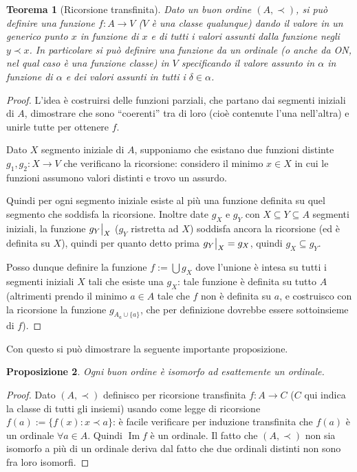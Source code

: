 \documentclass[a4paper,10pt,oneside]{article}
\newcommand\restr[2]{{%
  \left.\kern-\nulldelimiterspace %
  #1 %
  \vphantom{\big|} %
  \right|_{#2} %
  }}
\DeclareMathOperator{\im}{Im}
\theoremstyle{plain}
\newtheorem{mytheorem}{Teorema}[section]
\newtheorem{myprop}[mytheorem]{Proposizione}
\theoremstyle{definition}
\theoremstyle{remark}
\begin{document}
\begin{mytheorem}[Ricorsione transfinita]
 Dato un buon ordine $(A,\prec)$, si può definire una funzione $f:A \rightarrow V$ ($V$ è una classe qualunque) dando il valore in un generico punto $x$ in funzione di $x$ e di tutti i valori assunti dalla funzione negli $y\prec x$. In particolare si può definire una funzione da un ordinale (o anche da ON, nel qual caso è una funzione classe) in $V$ specificando il valore assunto in $\alpha$ in funzione di $\alpha$ e dei valori assunti in tutti i $\delta \in \alpha$.
\end{mytheorem}
\begin{proof}
 L'idea è costruirsi delle funzioni parziali, che partano dai segmenti iniziali di $A$, dimostrare che sono ``coerenti'' tra di loro (cioè contenute l'una nell'altra) e unirle tutte per ottenere $f$.
 
 Dato $X$ segmento iniziale di $A$, supponiamo che esistano due funzioni distinte $g_1 , g_2: X \rightarrow V$ che verificano la ricorsione: considero il minimo $x\in X$ in cui le funzioni assumono valori distinti e trovo un assurdo.
 
 Quindi per ogni segmento iniziale esiste al più una funzione definita su quel segmento che soddisfa la ricorsione.
 Inoltre date $g_X$ e $g_Y$ con $X\subseteq Y \subseteq A$ segmenti iniziali, la funzione $\restr{g_Y}X$ ($g_Y$ ristretta ad $X$) soddisfa ancora la ricorsione (ed è definita su $X$), quindi per quanto detto prima $\restr{g_Y}X=g_X$, quindi $g_X\subseteq g_Y$.
 
 Posso dunque definire la funzione $f:=\bigcup g_X$ dove l'unione è intesa su tutti i segmenti iniziali $X$ tali che esiste una $g_X$: tale funzione è definita su tutto $A$ (altrimenti prendo il minimo $a \in A$ tale che $f$ non è definita su $a$, e costruisco con la ricorsione la funzione $g_{A_a \cup \{a\}}$, che per definizione dovrebbe essere sottoinsieme di $f$).
\end{proof}

Con questo si può dimostrare la seguente importante proposizione.

\begin{myprop}\label{prop:isomord}
 Ogni buon ordine è isomorfo ad esattemente un ordinale.
\end{myprop}
\begin{proof}
 Dato $(A,\prec)$ definisco per ricorsione transfinita $f:A\rightarrow C$ ($C$ qui indica la classe di tutti gli insiemi) usando come legge di ricorsione $f(a):=\{f(x): x \prec a\}$: è facile verificare per induzione transfinita che $f(a)$ è un ordinale $\forall a\in A$. Quindi $\im f$ è un ordinale. Il fatto che $(A,\prec)$ non sia isomorfo a più di un ordinale deriva dal fatto che due ordinali distinti non sono fra loro isomorfi.
\end{proof}
\end{document}
